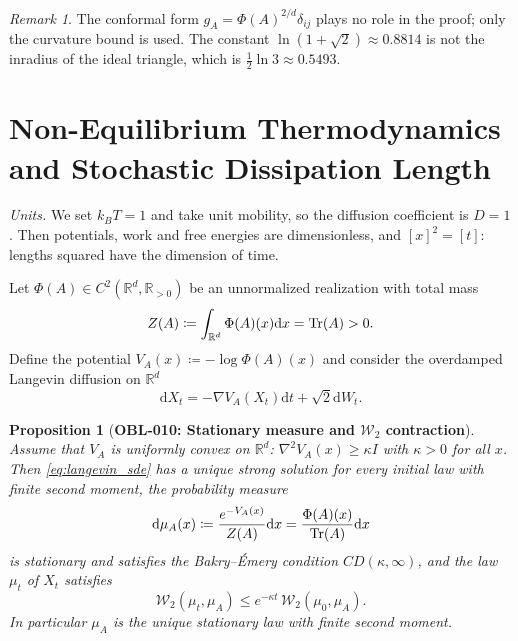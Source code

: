 \documentclass[11pt,a4paper,reqno]{amsart}
\newtheorem{proposition}[theorem]{Proposition}
\theoremstyle{definition}
\theoremstyle{remark}
\newtheorem{remark}[theorem]{Remark}
\numberwithin{equation}{section}
\newcommand{\dif}{\mathrm{d}}
\begin{document}
\begin{remark}
The conformal form $g_A = \Phi(A)^{2/d}\delta_{ij}$ plays no role in the proof; only the curvature bound is used. The constant $\ln(1+\sqrt2) \approx 0.8814$ is not the inradius of the ideal triangle, which is $\tfrac12\ln 3 \approx 0.5493$.
\end{remark}

\section{Non-Equilibrium Thermodynamics and Stochastic Dissipation Length}
\label{sec:thermo}

\emph{Units.} We set $k_B T = 1$ and take unit mobility, so the diffusion coefficient is $D = 1$. Then potentials, work and free energies are dimensionless, and $[x]^2 = [t]$: lengths squared have the dimension of time.

Let $\Phi(A) \in C^2(\mathbb{R}^d, \mathbb{R}_{>0})$ be an unnormalized realization with total mass
\begin{equation}
Z(A) \coloneqq \int_{\mathbb{R}^d} \Phi(A)(x) \dif x = \Tr(A) > 0.
\end{equation}
Define the potential $V_A(x) \coloneqq -\log \Phi(A)(x)$ and consider the overdamped Langevin diffusion on $\mathbb{R}^d$
\begin{equation}
\label{eq:langevin_sde}
\dif X_t = -\nabla V_A(X_t) \dif t + \sqrt{2} \dif W_t.
\end{equation}

\begin{proposition}[\textbf{OBL-010: Stationary measure and $\mathcal{W}_2$ contraction}]
\label{prop:langevin_ergodicity}
Assume that $V_A$ is uniformly convex on $\mathbb{R}^d$: $\nabla^2 V_A(x) \ge \kappa I$ with $\kappa > 0$ for all $x$. Then \eqref{eq:langevin_sde} has a unique strong solution for every initial law with finite second moment, the probability measure
\begin{equation}
\dif\mu_A(x) \coloneqq \frac{e^{-V_A(x)}}{Z(A)} \dif x = \frac{\Phi(A)(x)}{\Tr(A)} \dif x
\end{equation}
is stationary and satisfies the Bakry--\'Emery condition $CD(\kappa, \infty)$, and the law $\mu_t$ of $X_t$ satisfies
\begin{equation}
\mathcal{W}_2(\mu_t, \mu_A) \le e^{-\kappa t}\, \mathcal{W}_2(\mu_0, \mu_A).
\end{equation}
In particular $\mu_A$ is the unique stationary law with finite second moment.
\end{proposition}
\end{document}
